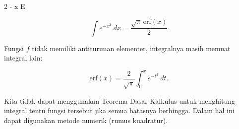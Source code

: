 \documentclass[a4paper,11pt,oneside,enabledeprecatedfontcommands]{scrbook}
\newenvironment{eulernotebook}{}{}
\newenvironment{eulercomment}{\par\medskip\noindent}{\par\medskip}
\newenvironment{eulerformula}{}{}
\begin{document}
\begin{eulernotebook}
\begin{euleroutput}
                                                      2
                                                   - x
                                                  E
  
\end{euleroutput}
\begin{eulerformula}
\[
\int {e^ {- x^2 }}{\;dx}=\frac{\sqrt{\pi}\,\mathrm{erf}\left(x  \right)}{2}
\]
\end{eulerformula}
\begin{eulercomment}
Fungsi $f$ tidak memiliki antiturunan elementer, integralnya masih memuat integral lain:
\end{eulercomment}
\begin{eulerformula}
\[
\mathrm{erf}(x) = \frac{2}{\sqrt{\pi}} \int_0^x e^{-t^2} \ dt.
\]
\end{eulerformula}
\begin{eulercomment}
Kita tidak dapat menggunakan Teorema Dasar Kalkulus untuk menghitung integral tentu fungsi tersebut jika semua batasnya berhingga. Dalam hal ini dapat digunakan metode numerik (rumus kuadratur).


\end{eulercomment}
\end{eulernotebook}
\end{document}
